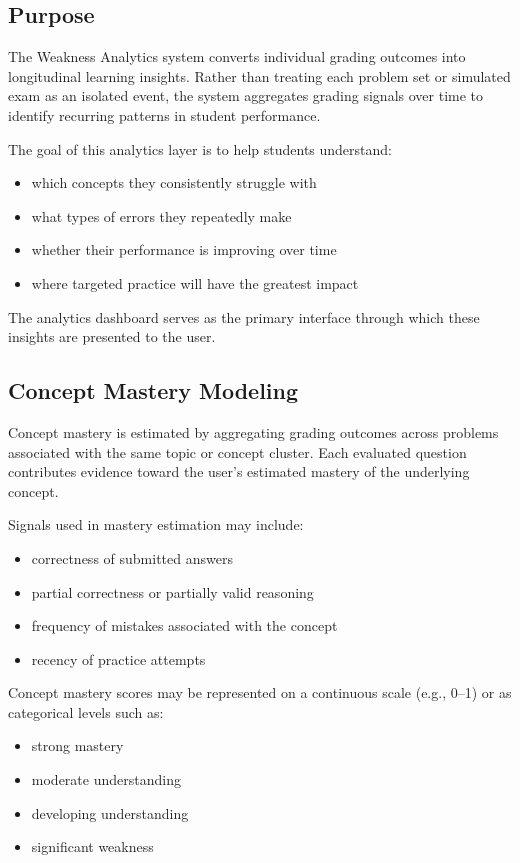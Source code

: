 \documentclass[11pt]{article}
\begin{document}
\subsection{Purpose}
The Weakness Analytics system converts individual grading outcomes into longitudinal learning insights. Rather than treating each problem set or simulated exam as an isolated event, the system aggregates grading signals over time to identify recurring patterns in student performance.

The goal of this analytics layer is to help students understand:
\begin{itemize}
\item which concepts they consistently struggle with
\item what types of errors they repeatedly make
\item whether their performance is improving over time
\item where targeted practice will have the greatest impact
\end{itemize}

The analytics dashboard serves as the primary interface through which these insights are presented to the user.

\subsection{Concept Mastery Modeling}
Concept mastery is estimated by aggregating grading outcomes across problems associated with the same topic or concept cluster. Each evaluated question contributes evidence toward the user's estimated mastery of the underlying concept.

Signals used in mastery estimation may include:

\begin{itemize}
\item correctness of submitted answers
\item partial correctness or partially valid reasoning
\item frequency of mistakes associated with the concept
\item recency of practice attempts
\end{itemize}

Concept mastery scores may be represented on a continuous scale (e.g., 0--1) or as categorical levels such as:

\begin{itemize}
\item strong mastery
\item moderate understanding
\item developing understanding
\item significant weakness
\end{itemize}
\end{document}
